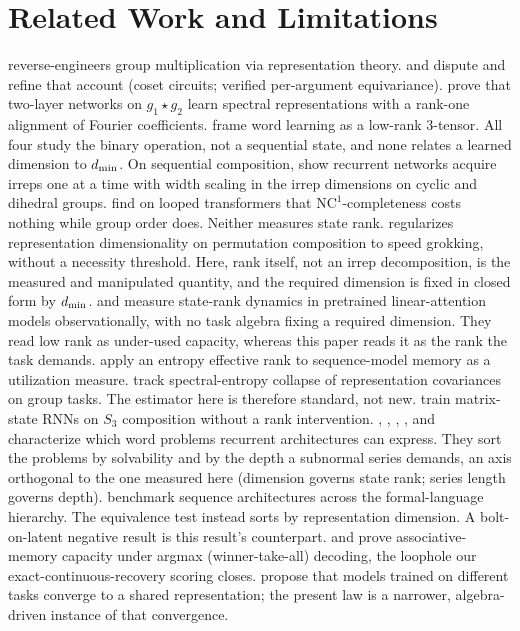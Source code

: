 \section{Related Work and Limitations}
\label{sec:related}

\citet{chughtai2023universality} reverse-engineers group multiplication via
representation theory. \citet{stander2024cosets} and \citet{wu2025unified}
dispute and refine that account (coset circuits; verified per-argument
equivariance). \citet{he2026spectral} prove that two-layer networks on
$g_1 \star g_2$ learn spectral representations with a rank-one alignment of
Fourier coefficients. \citet{shutman2025words} frame word learning as a
low-rank 3-tensor. All four study the binary operation, not a sequential state,
and none relates a learned dimension to $d_{\min}$. On sequential composition,
\citet{marchetti2026sequential} show recurrent networks acquire irreps one at a
time with width scaling in the irrep dimensions on cyclic and dihedral groups.
\citet{zhang2026recurrence} find on looped transformers that
$\mathrm{NC}^1$-completeness costs nothing while group order does. Neither
measures state rank. \citet{kazanskii2026grokking} regularizes
representation dimensionality on permutation composition to speed
grokking, without a necessity threshold. Here, rank itself, not an irrep
decomposition, is the measured and manipulated quantity, and the
required dimension is fixed in closed form by $d_{\min}$.
\citet{nazari2026rank} and \citet{sun2026staterank} measure
state-rank dynamics in pretrained linear-attention models observationally,
with no task algebra fixing a required dimension. They read low rank as
under-used capacity, whereas this paper reads it as the rank the task demands.
\citet{parnichkun2025ess} apply an entropy effective rank to sequence-model
memory as a utilization measure. \citet{truong2026spectral} track
spectral-entropy collapse of representation covariances on group tasks. The
estimator here is therefore standard, not new.
\citet{mishra2026m2rnn} train matrix-state RNNs on $S_3$ composition
without a rank intervention. \citet{grazzi2025negative},
\citet{siems2025deltaproduct}, \citet{merrill2024illusion},
\citet{shakerinava2026diagonal}, and \citet{nowak2026algebraic}
characterize which word problems recurrent architectures can express. They
sort the problems by solvability and by the depth a subnormal series demands,
an axis orthogonal to the one measured here (dimension governs state rank;
series length governs depth). \citet{deletang2023chomsky} benchmark sequence
architectures across the formal-language hierarchy. The equivalence test
instead sorts by representation dimension. A bolt-on-latent negative result
\citep{larson2026gradient} is this result's counterpart.
\citet{nichani2025factual} and \citet{barnfield2026sharp} prove
associative-memory capacity under argmax (winner-take-all) decoding, the
loophole our exact-continuous-recovery scoring closes.
\citet{huh2024platonic} propose that models trained on different tasks
converge to a shared representation; the present law is a narrower,
algebra-driven instance of that convergence.
